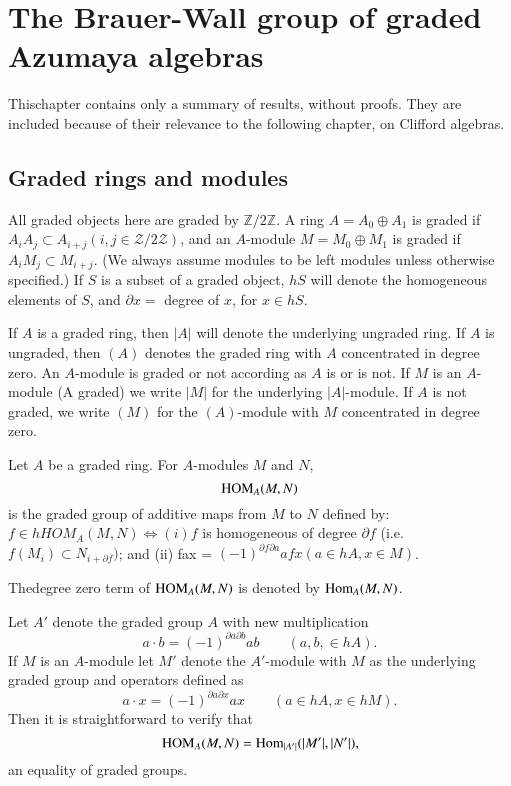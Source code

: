 \chapter{The Brauer-Wall group of graded Azumaya
  algebras}\label{chap4} %

This\pageoriginale chapter contains only a summary of results, without
proofs. They are included because of their relevance to the following
chapter, on Clifford algebras.   

\section{Graded rings and modules}\label{chap4:sec1} %

All graded objects here are graded by $\mathbb{Z} / 2 \mathbb{Z }$. A
ring $A = A_0 \oplus A_1$ is graded if $A_i A_j \subset A_{ i +j} (i,
j \in \mathscr{Z} / 2 \mathscr{Z})$, and an $A$-module $M = M_0 \oplus
M_1$ is graded if $A_i M_j \subset M_{i + j}$. (We always assume
modules to be left modules unless otherwise specified.) If $S$ is a
subset of a graded object, $hS$ will denote the homogeneous elements
of $S$, and $\partial x = $ degree of $x$, for $x \in h S$.  

If $A$ is a graded ring, then $|A|$ will denote the underlying
ungraded ring. If $A$ is ungraded, then $(A)$ denotes the graded ring
with $A$ concentrated in degree zero. An $A$-module is graded or not
according as $A$ is or is not. If $M$ is an $A$-module (A graded) we
write $|M|$ for the underlying $|A|$-module. If $A$ is not graded, we
write $(M)$ for the $(A)$-module with $M$ concentrated in degree zero.  

Let $A$ be a graded ring. For $A$-modules $M$ and $N$, 
$$
{\rm HOM}_A (M, N)
$$
is the graded group of additive maps from $M$ to $N$ defined by: $f
\in h HOM_A (M, N) \Leftrightarrow (i) f$ is homogeneous of degree
$\partial f$ (i.e. $f(M_i) \subset N_{ i + \partial f})$; and (ii) fax
= $(-1)^{\partial f \partial a} a fx (a \in hA, x \in M)$.  

The\pageoriginale degree zero term of ${\rm HOM}_A (M, N)$ is denoted by
${\rm Hom}_A (M, N)$.  

Let $A'$ denote the graded group $A$ with new multiplication  
$$
a \cdot b = (- 1)^{\partial a \partial b} ab \qquad (a, b, \in hA). 
$$
If $M$ is an $A$-module let $M'$ denote the $A'$-module with $M$ as
the underlying graded group and operators defined as  
$$
a \cdot  x = (-1)^{\partial a \partial x} ax \qquad (a \in hA, x \in h M). 
$$
Then it is straightforward to verify that 
$$
{\rm HOM}_A (M, N) = \operatorname{Hom}_{|A'|}(|M'|, |N'|), 
$$
an equality of graded groups. 

